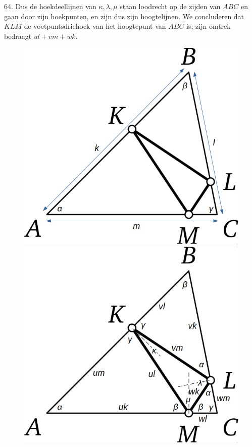 \begin{problem}{64.}
    Dus de hoekdeellijnen van $\kappa,\lambda,\mu$ staan loodrecht op de zijden van $ABC$ en gaan door zijn hoekpunten, en zijn dus zijn hoogtelijnen. We concluderen dat $KLM$ de voetpuntsdriehoek van het hoogtepunt van $ABC$ is; zijn omtrek bedraagt $u l + v m + w k$.
    \begin{figure}
        \vspace{0.5cm}
        \includegraphics[scale=0.14]{resources/oplossing641}
        \hspace{0.1cm}
        \includegraphics[scale=0.14]{resources/oplossing642}

\end{figure}
\end{problem}
